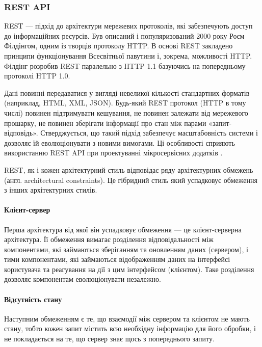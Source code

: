\subsubsection{REST API}

REST — підхід до архітектури мережевих протоколів, які забезпечують доступ до інформаційних ресурсів. Був описаний і популяризований 2000 року Роєм Філдінгом, одним із творців протоколу HTTP. В основі REST закладено принципи функціонування Всесвітньої павутини і, зокрема, можливості HTTP. Філдінг розробив REST паралельно з HTTP 1.1 базуючись на попередньому протоколі HTTP 1.0.

Дані повинні передаватися у вигляді невеликої кількості стандартних форматів (наприклад, HTML, XML, JSON). Будь-який REST протокол (HTTP в тому числі) повинен підтримувати кешування, не повинен залежати від мережевого прошарку, не повинен зберігати інформації про стан між парами «запит-відповідь». Стверджується, що такий підхід забезпечує масштабовність системи і дозволяє їй еволюціонувати з новими вимогами. Ці особливості сприяють використанню REST API при проектуванні мікросервісних додатків \cite[158]{кучер2018мікросервісна}.

REST, як і кожен архітектурний стиль відповідає ряду архітектурних обмежень (англ. architectural constraints). Це гібридний стиль який успадковує обмеження з інших архітектурних стилів.

\paragraph{Клієнт-сервер}

Перша архітектура від якої він успадковує обмеження — це клієнт-серверна архітектура. Її обмеження вимагає розділення відповідальності між компонентами, які займаються зберіганням та оновленням даних (сервером), і тими компонентами, які займаються відображенням даних на інтерфейсі користувача та реагування на дії з цим інтерфейсом (клієнтом). Таке розділення дозволяє компонентам еволюціонувати незалежно.

\paragraph{Відсутність стану}

Наступним обмеженням є те, що взаємодії між сервером та клієнтом не мають стану, тобто кожен запит містить всю необхідну інформацію для його обробки, і не покладається на те, що сервер знає щось з попереднього запиту.

